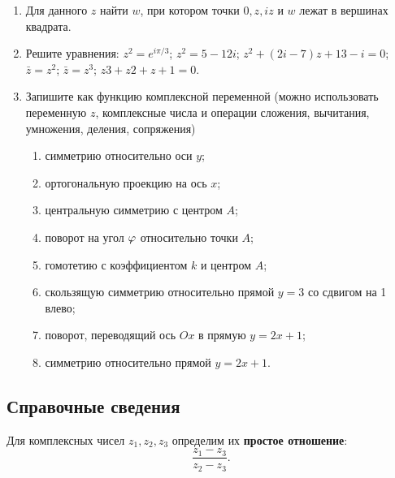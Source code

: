 \begin{enumerate}
\item Для данного $z$ найти $w$, при котором точки $0, z, iz$ и $w$ лежат в вершинах квадрата.

\item Решите уравнения:
\ipunkt $z^2 = e^{i\pi/3}$;
\ipunkt $z^2 = 5 - 12i$;
\ipunkt $z^2 + (2i - 7)z + 13 - i = 0$; 
\ipunkt $\bar z = z^2$; 
\ipunkt $\bar z = z^3$;
\ipunkt $z 3 + z 2 + z + 1 = 0$.

\item Запишите как функцию комплексной переменной (можно использовать переменную $z$, 
комплексные числа и операции сложения, вычитания, умножения, деления, сопряжения)
\begin{enumerate}
\item симметрию относительно оси $y$;
\item ортогональную проекцию на ось $x$;
\item центральную симметрию с центром $A$;
\item поворот на угол $\varphi$ относительно точки $A$;
\item гомотетию с коэффициентом $k$ и центром $A$;
\item скользящую симметрию относительно прямой $y = 3$ со сдвигом на 1 влево;
\item поворот, переводящий ось $Ox$ в прямую $y = 2x + 1$;
\item симметрию относительно прямой $y = 2x + 1$.
\end{enumerate}

\end{enumerate}

\subsection*{Справочные сведения}

Для комплексных чисел $z_1,z_2,z_3$ определим их \textbf{простое отношение}:
$$
\frac{z_1-z_3}{z_2-z_3}.
$$


